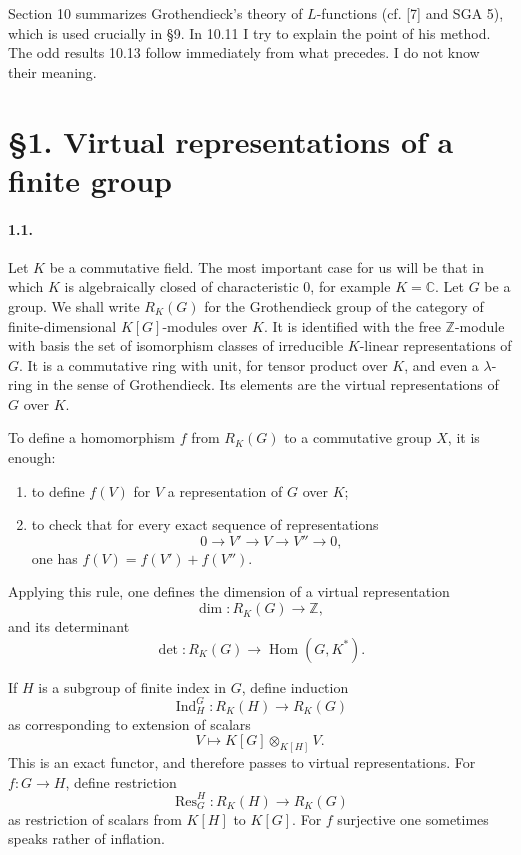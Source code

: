 \documentclass[10pt]{article}
\newcommand{\C}{\mathbb C}
\newcommand{\Z}{\mathbb Z}
\newcommand{\Hom}{\operatorname{Hom}}
\newcommand{\Ind}{\operatorname{Ind}}
\newcommand{\Res}{\operatorname{Res}}
\begin{document}
Section 10 summarizes Grothendieck's theory of \(L\)-functions (cf. [7] and SGA 5), which is used crucially in §9. In 10.11 I try to explain the point of his method. The odd results 10.13 follow immediately from what precedes. I do not know their meaning.

\section*{\S1. Virtual representations of a finite group}

\paragraph{1.1.} Let \(K\) be a commutative field. The most important case for us will be that in which \(K\) is algebraically closed of characteristic \(0\), for example \(K=\C\). Let \(G\) be a group. We shall write \(R_K(G)\) for the Grothendieck group of the category of finite-dimensional \(K[G]\)-modules over \(K\). It is identified with the free \(\Z\)-module with basis the set of isomorphism classes of irreducible \(K\)-linear representations of \(G\). It is a commutative ring with unit, for tensor product over \(K\), and even a \(\lambda\)-ring in the sense of Grothendieck. Its elements are the virtual representations of \(G\) over \(K\).

To define a homomorphism \(f\) from \(R_K(G)\) to a commutative group \(X\), it is enough:
\begin{enumerate}[label=\alph*)]
\item to define \(f(V)\) for \(V\) a representation of \(G\) over \(K\);
\item to check that for every exact sequence of representations
\[
0\longrightarrow V'\longrightarrow V\longrightarrow V''\longrightarrow0,
\]
one has \(f(V)=f(V')+f(V'')\).
\end{enumerate}
Applying this rule, one defines the dimension of a virtual representation
\[
\dim:R_K(G)\longrightarrow\Z,
\]
and its determinant
\[
\det:R_K(G)\longrightarrow\Hom(G,K^*).
\]

If \(H\) is a subgroup of finite index in \(G\), define induction
\[
\Ind_H^G:R_K(H)\longrightarrow R_K(G)
\]
as corresponding to extension of scalars
\[
V\longmapsto K[G]\otimes_{K[H]}V.
\]
This is an exact functor, and therefore passes to virtual representations. For \(f:G\to H\), define restriction
\[
\Res_G^H:R_K(H)\longrightarrow R_K(G)
\]
as restriction of scalars from \(K[H]\) to \(K[G]\). For \(f\) surjective one sometimes speaks rather of inflation.
\end{document}
